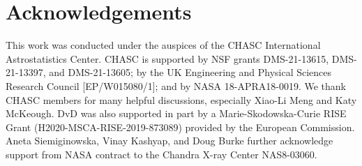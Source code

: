 \documentclass[twocolumn]{aastex631}
\begin{document}
    \section*{Acknowledgements}
    This work was conducted under the auspices of the CHASC International Astrostatistics Center.
    CHASC is supported by NSF grants DMS-21-13615, DMS-21-13397, and DMS-21-13605; by the UK Engineering
    and Physical Sciences Research Council [EP/W015080/1]; and by NASA 18-APRA18-0019.
    We thank CHASC members for many helpful discussions, especially Xiao-Li Meng and Katy McKeough.
    DvD was also supported in part by a Marie-Skodowska-Curie RISE Grant (H2020-MSCA-RISE-2019-873089)
    provided by the European Commission.
    Aneta Siemiginowska, Vinay Kashyap, and Doug Burke further acknowledge support from NASA
    contract to the Chandra X-ray Center NAS8-03060.

    \newpage
    
\end{document}
